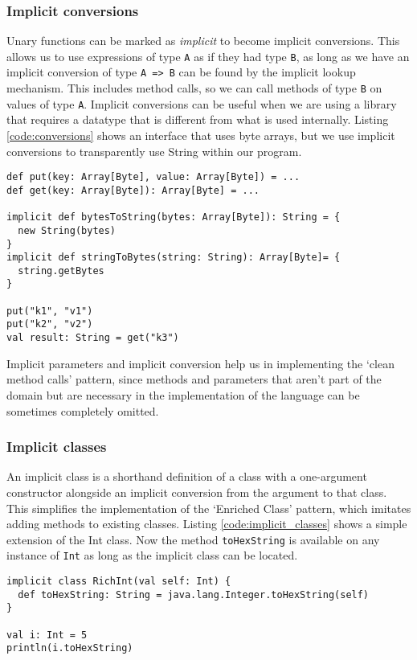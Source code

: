 \subsubsection{Implicit conversions}
Unary functions can be marked as {\it implicit} to become implicit conversions.
This allows us to use expressions of type \texttt{A} as if they had type \texttt{B}, as long as we have an implicit conversion of type \texttt{A => B} can be found by the implicit lookup mechanism.
This includes method calls, so we can call methods of type \texttt{B} on values of type \texttt{A}.
Implicit conversions can be useful when we are using a library that requires a datatype that is different from what is used internally.
Listing \ref{code:conversions} shows an interface that uses byte arrays, but we use implicit conversions to transparently use String within our program.

\begin{lstlisting}[caption=Implicit conversions, label=code:conversions, float]
def put(key: Array[Byte], value: Array[Byte]) = ...
def get(key: Array[Byte]): Array[Byte] = ...

implicit def bytesToString(bytes: Array[Byte]): String = {
  new String(bytes)
}
implicit def stringToBytes(string: String): Array[Byte]= {
  string.getBytes
}

put("k1", "v1")
put("k2", "v2")
val result: String = get("k3")
\end{lstlisting}

Implicit parameters and implicit conversion help us in implementing the `clean method calls' pattern, since methods and parameters that aren't part of the domain but are necessary in the implementation of the language can be sometimes completely omitted.

\subsubsection{Implicit classes}
An implicit class is a shorthand definition of a class with a one-argument constructor alongside an implicit conversion from the argument to that class.
This simplifies the implementation of the `Enriched Class' pattern, which imitates adding methods to existing classes.
Listing \ref{code:implicit_classes} shows a simple extension of the Int class.
Now the method \texttt{toHexString} is available on any instance of \texttt{Int} as long as the implicit class can be located.

\begin{lstlisting}[caption=Implicit class, label=code:implicit_classes, float]
implicit class RichInt(val self: Int) {
  def toHexString: String = java.lang.Integer.toHexString(self)
}

val i: Int = 5
println(i.toHexString)
\end{lstlisting}

